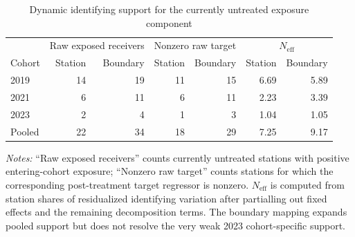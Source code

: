 \begin{table}[!htbp]
\centering
\caption{Dynamic identifying support for the currently untreated exposure component}
\label{tab:ulez_boundary_dynamic_support}
\small
\begin{threeparttable}
\begin{tabular}{lrrrrrr}
\toprule
& \multicolumn{2}{c}{Raw exposed receivers} & \multicolumn{2}{c}{Nonzero raw target} & \multicolumn{2}{c}{$N_{\mathrm{eff}}$} \\
Cohort & Station & Boundary & Station & Boundary & Station & Boundary \\
\midrule
2019 & 14 & 19 & 11 & 15 & 6.69 & 5.89 \\
2021 & 6 & 11 & 6 & 11 & 2.23 & 3.39 \\
2023 & 2 & 4 & 1 & 3 & 1.04 & 1.05 \\
\midrule
Pooled & 22 & 34 & 18 & 29 & 7.25 & 9.17 \\
\bottomrule
\end{tabular}
\begin{tablenotes}
\footnotesize
\item \emph{Notes:} ``Raw exposed receivers'' counts currently untreated stations with positive entering-cohort exposure; ``Nonzero raw target'' counts stations for which the corresponding post-treatment target regressor is nonzero. $N_{\mathrm{eff}}$ is computed from station shares of residualized identifying variation after partialling out fixed effects and the remaining decomposition terms. The boundary mapping expands pooled support but does not resolve the very weak 2023 cohort-specific support.
\end{tablenotes}
\end{threeparttable}
\end{table}
